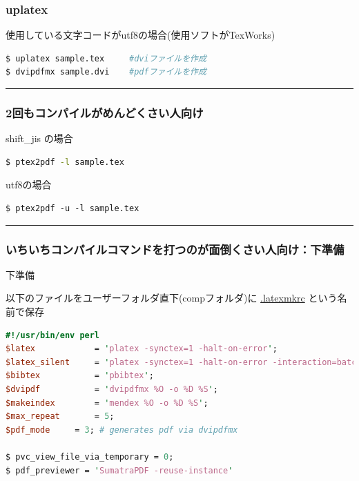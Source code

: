 \subsubsection{uplatex}\label{uplatex}

使用している文字コードがutf8の場合(使用ソフトがTexWorks)

\begin{lstlisting}[language=bash]
$ uplatex sample.tex     #dviファイルを作成
$ dvipdfmx sample.dvi    #pdfファイルを作成
\end{lstlisting}

\begin{center}\rule{0.5\linewidth}{\linethickness}\end{center}

\subsubsection{2回もコンパイルがめんどくさい人向け}\label{ux56deux3082ux30b3ux30f3ux30d1ux30a4ux30ebux304cux3081ux3093ux3069ux304fux3055ux3044ux4ebaux5411ux3051}

shift\_jis の場合

\begin{lstlisting}[language=bash]
$ ptex2pdf -l sample.tex
\end{lstlisting}

utf8の場合

\begin{lstlisting}
$ ptex2pdf -u -l sample.tex
\end{lstlisting}

\begin{center}\rule{0.5\linewidth}{\linethickness}\end{center}

\subsubsection{いちいちコンパイルコマンドを打つのが面倒くさい人向け：下準備}\label{ux3044ux3061ux3044ux3061ux30b3ux30f3ux30d1ux30a4ux30ebux30b3ux30deux30f3ux30c9ux3092ux6253ux3064ux306eux304cux9762ux5012ux304fux3055ux3044ux4ebaux5411ux3051ux4e0bux6e96ux5099}

下準備

以下のファイルをユーザーフォルダ直下(compフォルダ)に
\href{/distribute/.latexmkrc}{.latexmkrc} という名前で保存

\begin{lstlisting}[language=Perl]
#!/usr/bin/env perl
$latex            = 'platex -synctex=1 -halt-on-error';
$latex_silent     = 'platex -synctex=1 -halt-on-error -interaction=batchmode';
$bibtex           = 'pbibtex';
$dvipdf           = 'dvipdfmx %O -o %D %S';
$makeindex        = 'mendex %O -o %D %S';
$max_repeat       = 5;
$pdf_mode     = 3; # generates pdf via dvipdfmx

$ pvc_view_file_via_temporary = 0;
$ pdf_previewer = 'SumatraPDF -reuse-instance'
\end{lstlisting}

